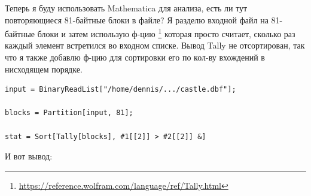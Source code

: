 Теперь я буду использовать Mathematica для анализа, есть ли тут повторяющиеся 81-байтные блоки в файле?
Я разделю входной файл на 81-байтные блоки и затем использую ф-цию
\footnote{\url{https://reference.wolfram.com/language/ref/Tally.html}}
которая просто считает, сколько раз каждый элемент встретился во входном списке.
Вывод Tally не отсортирован, так что я также добавлю ф-цию  для сортировки его по кол-ву вхождений
в нисходящем порядке.

\begin{lstlisting}[style=custommath]
input = BinaryReadList["/home/dennis/.../castle.dbf"];

blocks = Partition[input, 81];

stat = Sort[Tally[blocks], #1[[2]] > #2[[2]] &]
\end{lstlisting}

И вот вывод:

